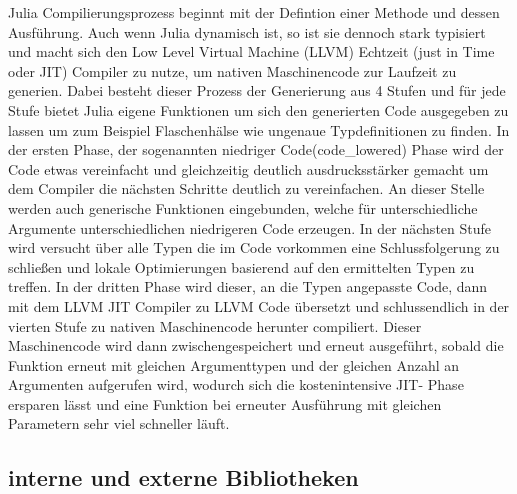 \documentclass[proseminar,german,utf8]{zihpub}
\begin{document}
Julia Compilierungsprozess beginnt mit der Defintion einer Methode und dessen Ausführung. Auch wenn Julia dynamisch ist, so ist sie dennoch stark typisiert und macht sich den Low Level Virtual Machine (LLVM) Echtzeit (just in Time oder JIT) Compiler zu nutze, um nativen Maschinencode zur Laufzeit zu generien. Dabei besteht dieser Prozess der Generierung aus 4 Stufen und für jede Stufe bietet Julia eigene Funktionen um sich den generierten Code ausgegeben zu lassen um zum Beispiel Flaschenhälse wie ungenaue Typdefinitionen zu finden. In der ersten Phase, der sogenannten niedriger Code(code\_lowered) Phase wird der Code etwas vereinfacht und gleichzeitig deutlich ausdrucksstärker gemacht um dem Compiler die nächsten Schritte deutlich zu vereinfachen. An dieser Stelle werden auch generische Funktionen eingebunden, welche für unterschiedliche Argumente unterschiedlichen niedrigeren Code erzeugen. In der nächsten Stufe wird versucht über alle Typen die im Code vorkommen eine Schlussfolgerung zu schließen und lokale Optimierungen basierend auf den ermittelten Typen zu treffen. In der dritten Phase wird dieser, an die Typen angepasste Code, dann mit dem LLVM JIT Compiler zu LLVM Code übersetzt  und schlussendlich in der vierten Stufe zu nativen Maschinencode herunter compiliert. Dieser Maschinencode wird dann zwischengespeichert und erneut ausgeführt, sobald die Funktion erneut mit gleichen Argumenttypen und der gleichen Anzahl an Argumenten aufgerufen wird, wodurch sich die kostenintensive JIT- Phase ersparen lässt und eine Funktion bei erneuter Ausführung mit gleichen Parametern sehr viel schneller läuft.

\subsection{interne und externe Bibliotheken}
\end{document}
